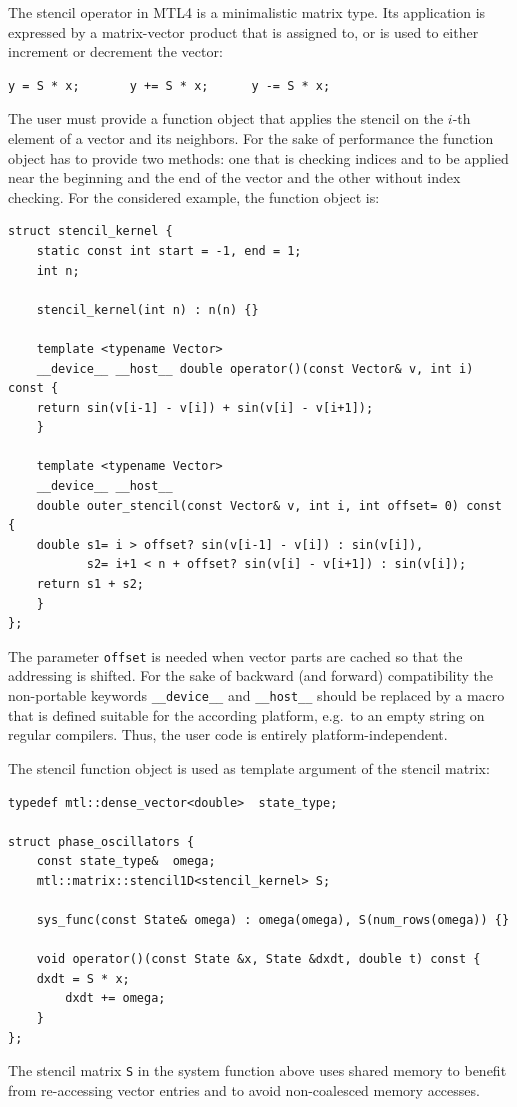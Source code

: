 \documentclass[final]{siamltex}
\newcommand{\code}[1]{\lstinline$#1$}
\begin{document}
The stencil operator in MTL4 is a minimalistic matrix type.
Its application is expressed by a matrix-vector product that is assigned
to, or is used to either increment or decrement the vector:
\begin{lstlisting}
y = S * x;       y += S * x;      y -= S * x;
\end{lstlisting}
The user must provide a function object that applies the stencil on
the $i$-th element of a vector and its neighbors.
For the sake of performance the function object has to provide two methods:
one that is checking indices and to be applied near the beginning and the end
of the vector and the other without index checking.  For the considered
example, the function object is:
\begin{lstlisting}
struct stencil_kernel {
    static const int start = -1, end = 1;
    int n;

    stencil_kernel(int n) : n(n) {}

    template <typename Vector>
    __device__ __host__ double operator()(const Vector& v, int i) const {
	return sin(v[i-1] - v[i]) + sin(v[i] - v[i+1]);
    }

    template <typename Vector>
    __device__ __host__
    double outer_stencil(const Vector& v, int i, int offset= 0) const {
	double s1= i > offset? sin(v[i-1] - v[i]) : sin(v[i]),
	       s2= i+1 < n + offset? sin(v[i] - v[i+1]) : sin(v[i]);
	return s1 + s2;
    }
};
\end{lstlisting}
The parameter \code{offset} is needed when vector parts are cached so that the
addressing is shifted.
For the sake of backward (and forward) compatibility the non-portable keywords
\code{__device__} and \code{__host__} should be replaced by a macro that is
defined suitable for the according platform, e.g.~to an empty string on regular
compilers.  Thus, the user code is entirely platform-independent.

The stencil function object is used as template argument of the stencil matrix:
\begin{lstlisting}
typedef mtl::dense_vector<double>  state_type;

struct phase_oscillators {
    const state_type&  omega;
    mtl::matrix::stencil1D<stencil_kernel> S;

    sys_func(const State& omega) : omega(omega), S(num_rows(omega)) {}

    void operator()(const State &x, State &dxdt, double t) const {
	dxdt = S * x;
        dxdt += omega;
    }
};
\end{lstlisting}
The stencil matrix \code{S} in the system function above
uses shared memory to benefit from re-accessing vector entries
and to avoid non-coalesced memory accesses.
\end{document}

